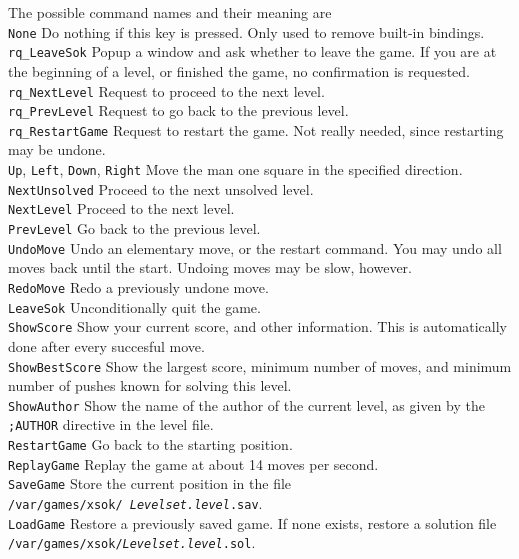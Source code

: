 The possible command names and their meaning are\\
{\tt None} Do nothing if this key is pressed. Only used to remove built-in
bindings.\\
{\tt rq\_LeaveSok} Popup a window and ask whether to leave the game. If you are
at the beginning of a level, or finished the game, no confirmation is
requested.\\
{\tt rq\_NextLevel} Request to proceed to the next level.\\
{\tt rq\_PrevLevel} Request to go back to the previous level.\\
{\tt rq\_RestartGame} Request to restart the game. Not really needed, since
restarting may be undone.\\
{\tt Up}, {\tt Left}, {\tt Down}, {\tt Right} Move the man one square in the
specified direction.\\
{\tt NextUnsolved} Proceed to the next unsolved level.\\
{\tt NextLevel} Proceed to the next level.\\
{\tt PrevLevel} Go back to the previous level.\\
{\tt UndoMove} Undo an elementary move, or the restart command. You may undo
all moves back until the start. Undoing moves may be slow, however.\\
{\tt RedoMove} Redo a previously undone move.\\
{\tt LeaveSok} Unconditionally quit the game.\\
{\tt ShowScore} Show your current score, and other information. This is
automatically done after every succesful move.\\
{\tt ShowBestScore} Show the largest score, minimum number of moves, and
minimum number of pushes known for solving this level.\\
{\tt ShowAuthor} Show the name of the author of the current level, as given by
the {\tt ;AUTHOR} directive in the level file.\\
{\tt RestartGame} Go back to the starting position.\\
{\tt ReplayGame} Replay the game at about 14 moves per second.\\
{\tt SaveGame} Store the current position in the file\\{\tt /var/games/xsok/{\it
  Levelset.level\/}.sav}.\\
{\tt LoadGame} Restore a previously saved game. If none exists, restore a
solution file {\tt /var/games/xsok/{\it Levelset.level\/}.sol}.\\
